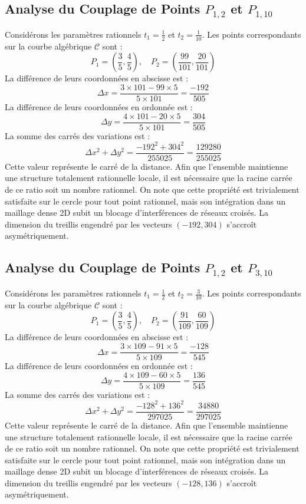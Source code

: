 \documentclass[12pt, a4paper]{article}
\begin{document}
\subsection{Analyse du Couplage de Points $P_{1,2}$ et $P_{1,10}$}
Considérons les paramètres rationnels $t_1 = \frac{1}{2}$ et $t_2 = \frac{1}{10}$.
Les points correspondants sur la courbe algébrique $\mathcal{C}$ sont :
$$ P_1 = \left( \frac{3}{5}, \frac{4}{5} \right), \quad P_2 = \left( \frac{99}{101}, \frac{20}{101} \right) $$
La différence de leurs coordonnées en abscisse est :
$$ \Delta x = \frac{3 \times 101 - 99 \times 5}{5 \times 101} = \frac{-192}{505} $$
La différence de leurs coordonnées en ordonnée est :
$$ \Delta y = \frac{4 \times 101 - 20 \times 5}{5 \times 101} = \frac{304}{505} $$
La somme des carrés des variations est :
$$ \Delta x^2 + \Delta y^2 = \frac{ -192^2 + 304^2 }{ 255025 } = \frac{ 129280 }{ 255025 } $$
Cette valeur représente le carré de la distance. Afin que l'ensemble maintienne une structure totalement rationnelle locale, il est nécessaire que la racine carrée de ce ratio soit un nombre rationnel. On note que cette propriété est trivialement satisfaite sur le cercle pour tout point rationnel, mais son intégration dans un maillage dense 2D subit un blocage d'interférences de réseaux croisés. La dimension du treillis engendré par les vecteurs $( -192, 304 )$ s'accroît asymétriquement.


\subsection{Analyse du Couplage de Points $P_{1,2}$ et $P_{3,10}$}
Considérons les paramètres rationnels $t_1 = \frac{1}{2}$ et $t_2 = \frac{3}{10}$.
Les points correspondants sur la courbe algébrique $\mathcal{C}$ sont :
$$ P_1 = \left( \frac{3}{5}, \frac{4}{5} \right), \quad P_2 = \left( \frac{91}{109}, \frac{60}{109} \right) $$
La différence de leurs coordonnées en abscisse est :
$$ \Delta x = \frac{3 \times 109 - 91 \times 5}{5 \times 109} = \frac{-128}{545} $$
La différence de leurs coordonnées en ordonnée est :
$$ \Delta y = \frac{4 \times 109 - 60 \times 5}{5 \times 109} = \frac{136}{545} $$
La somme des carrés des variations est :
$$ \Delta x^2 + \Delta y^2 = \frac{ -128^2 + 136^2 }{ 297025 } = \frac{ 34880 }{ 297025 } $$
Cette valeur représente le carré de la distance. Afin que l'ensemble maintienne une structure totalement rationnelle locale, il est nécessaire que la racine carrée de ce ratio soit un nombre rationnel. On note que cette propriété est trivialement satisfaite sur le cercle pour tout point rationnel, mais son intégration dans un maillage dense 2D subit un blocage d'interférences de réseaux croisés. La dimension du treillis engendré par les vecteurs $( -128, 136 )$ s'accroît asymétriquement.
\end{document}
